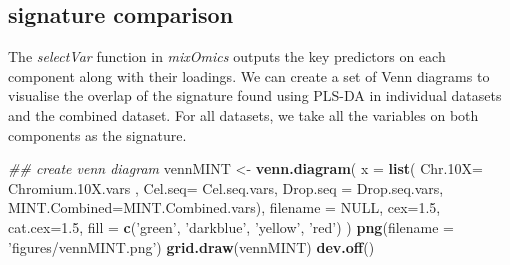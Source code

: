 \documentclass[]{book}
\newenvironment{Shaded}{\begin{snugshade}}{\end{snugshade}}
\newcommand{\CommentTok}[1]{\textcolor[rgb]{0.56,0.35,0.01}{\textit{#1}}}
\newcommand{\DataTypeTok}[1]{\textcolor[rgb]{0.13,0.29,0.53}{#1}}
\newcommand{\DecValTok}[1]{\textcolor[rgb]{0.00,0.00,0.81}{#1}}
\newcommand{\FloatTok}[1]{\textcolor[rgb]{0.00,0.00,0.81}{#1}}
\newcommand{\KeywordTok}[1]{\textcolor[rgb]{0.13,0.29,0.53}{\textbf{#1}}}
\newcommand{\NormalTok}[1]{#1}
\newcommand{\OperatorTok}[1]{\textcolor[rgb]{0.81,0.36,0.00}{\textbf{#1}}}
\newcommand{\OtherTok}[1]{\textcolor[rgb]{0.56,0.35,0.01}{#1}}
\newcommand{\StringTok}[1]{\textcolor[rgb]{0.31,0.60,0.02}{#1}}
\theoremstyle{definition}
\theoremstyle{definition}
\theoremstyle{definition}
\theoremstyle{remark}
\begin{document}
\hypertarget{signature-comparison}{%
\subsection{signature comparison}\label{signature-comparison}}

The \emph{selectVar} function in \emph{mixOmics} outputs the key
predictors on each component along with their loadings. We can create a
set of Venn diagrams to visualise the overlap of the signature found
using PLS-DA in individual datasets and the combined dataset. For all
datasets, we take all the variables on both components as the signature.

\begin{Shaded}
\end{Shaded}

\begin{Shaded}
\begin{Highlighting}[]
\CommentTok{## create venn diagram}
\NormalTok{vennMINT <-}\StringTok{ }\KeywordTok{venn.diagram}\NormalTok{(}
    \DataTypeTok{x =} \KeywordTok{list}\NormalTok{(}
        \DataTypeTok{Chr.10X=}\NormalTok{ Chromium}\FloatTok{.10}\NormalTok{X.vars ,}
        \DataTypeTok{Cel.seq=}\NormalTok{ Cel.seq.vars,}
        \DataTypeTok{Drop.seq =}\NormalTok{ Drop.seq.vars,}
        \DataTypeTok{MINT.Combined=}\NormalTok{MINT.Combined.vars),}
    \DataTypeTok{filename =} \OtherTok{NULL}\NormalTok{,}
    \DataTypeTok{cex=}\FloatTok{1.5}\NormalTok{, }\DataTypeTok{cat.cex=}\FloatTok{1.5}\NormalTok{,}
    \DataTypeTok{fill =} \KeywordTok{c}\NormalTok{(}\StringTok{'green'}\NormalTok{, }\StringTok{'darkblue'}\NormalTok{,  }\StringTok{'yellow'}\NormalTok{, }\StringTok{'red'}\NormalTok{)}
\NormalTok{    )}
\KeywordTok{png}\NormalTok{(}\DataTypeTok{filename =} \StringTok{'figures/vennMINT.png'}\NormalTok{)}
\KeywordTok{grid.draw}\NormalTok{(vennMINT)}
\KeywordTok{dev.off}\NormalTok{()}
\end{Highlighting}
\end{Shaded}
\end{document}

